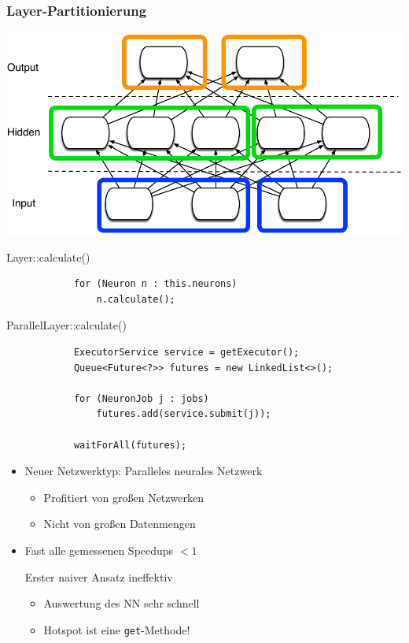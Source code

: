\documentclass[18pt]{beamer}
\begin{document}
	\begin{frame}\frametitle{Layer-Partitionierung}
	    \includegraphics[scale=0.7]{Grafiken/Feingranular.pdf}
	
	\framebreak

		\begin{block}{Layer::calculate()}
			\begin{lstlisting}
			for (Neuron n : this.neurons) 
			    n.calculate();
	 		\end{lstlisting}
 		\end{block}

		\begin{block}{ParallelLayer::calculate()}
	 		\begin{lstlisting}
			ExecutorService service = getExecutor();
			Queue<Future<?>> futures = new LinkedList<>();

			for (NeuronJob j : jobs)
			    futures.add(service.submit(j));
			
			waitForAll(futures);
	 		\end{lstlisting}
	 	\end{block}

 		\framebreak
	
		\begin{itemize}
			\item Neuer Netzwerktyp: Paralleles neurales Netzwerk
			\begin{itemize}
				\item Profitiert von großen Netzwerken
				\item Nicht von großen Datenmengen
			\end{itemize}
			\item Fast alle gemessenen Speedups $<1$ 
			\begin{alertblock}{Erster naiver Ansatz ineffektiv}
				\begin{itemize}
					\item Auswertung des NN sehr schnell
					\item Hotspot ist eine \texttt{get}-Methode!
				\end{itemize}
			\end{alertblock}


\end{itemize}
\end{frame}
\end{document}
